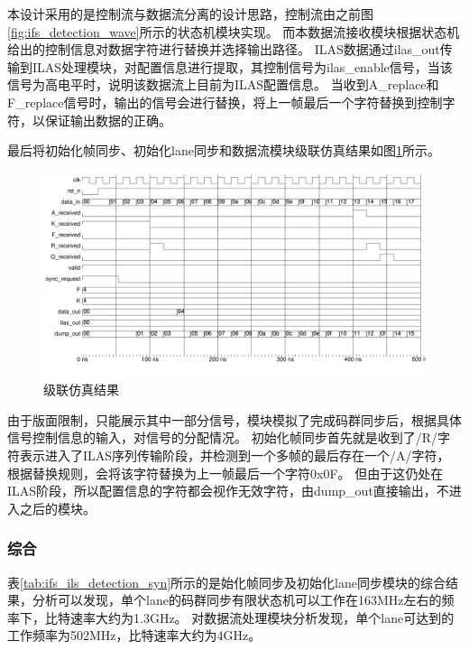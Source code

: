 \documentclass[UTF8]{ctexart}
\begin{document}
本设计采用的是控制流与数据流分离的设计思路，控制流由之前图\ref{fig:ifs_detection_wave}所示的状态机模块实现。
而本数据流接收模块根据状态机给出的控制信息对数据字符进行替换并选择输出路径。
ILAS数据通过ilas\_out传输到ILAS处理模块，对配置信息进行提取，其控制信号为ilas\_enable信号，当该信号为高电平时，说明该数据流上目前为ILAS配置信息。
当收到A\_replace和F\_replace信号时，输出的信号会进行替换，将上一帧最后一个字符替换到控制字符，以保证输出数据的正确。

最后将初始化帧同步、初始化lane同步和数据流模块级联仿真结果如图\ref{fig:recv_top_wave}所示。

\begin{figure}[H]
	\centering
	\includegraphics[width=18cm]{./img/recv_top_wave.pdf}
	\caption{级联仿真结果}
	\label{fig:recv_top_wave}
\end{figure}

由于版面限制，只能展示其中一部分信号，模块模拟了完成码群同步后，根据具体信号控制信息的输入，对信号的分配情况。
初始化帧同步首先就是收到了/R/字符表示进入了ILAS序列传输阶段，并检测到一个多帧的最后存在一个/A/字符，根据替换规则，会将该字符替换为上一帧最后一个字符0x0F。
但由于这仍处在ILAS阶段，所以配置信息的字符都会视作无效字符，由dump\_out直接输出，不进入之后的模块。

\subsubsection{综合}

表\ref{tab:ifs_ils_detection_syn}所示的是始化帧同步及初始化lane同步模块的综合结果，分析可以发现，单个lane的码群同步有限状态机可以工作在163MHz左右的频率下，比特速率大约为1.3GHz。
对数据流处理模块分析发现，单个lane可达到的工作频率为502MHz，比特速率大约为4GHz。
\end{document}
